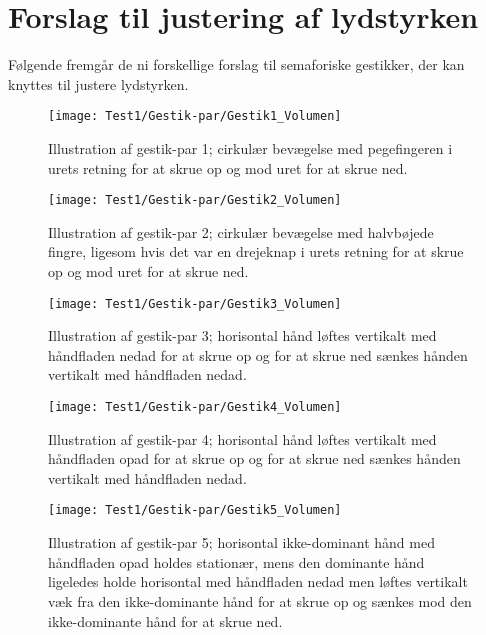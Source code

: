 \section{Forslag til justering af lydstyrken}
\label{app:ForslagVolumen}
%
Følgende fremgår de ni forskellige forslag til semaforiske gestikker, der kan knyttes til justere lydstyrken.
%
\begin{figure}[H]
	\centering
	\texttt{[image: Test1/Gestik-par/Gestik1\_Volumen]}
	\caption{Illustration af gestik-par 1; cirkulær bevægelse med pegefingeren i urets retning for at skrue op og mod uret for at skrue ned.}
	\label{fig:GestikPar1VolumenApp}
\end{figure}
\noindent
%
%
\begin{figure}[H]
	\centering
	\texttt{[image: Test1/Gestik-par/Gestik2\_Volumen]}
	\caption{Illustration af gestik-par 2; cirkulær bevægelse med halvbøjede fingre, ligesom hvis det var en drejeknap i urets retning for at skrue op og mod uret for at skrue ned.}
	\label{fig:GestikPar2VolumenApp}
\end{figure}
\noindent
%
\newpage
%
\begin{figure}[H]
	\centering
	\texttt{[image: Test1/Gestik-par/Gestik3\_Volumen]}
	\caption{Illustration af gestik-par 3; horisontal hånd løftes vertikalt med håndfladen nedad for at skrue op og for at skrue ned sænkes hånden vertikalt med håndfladen nedad.}
	\label{fig:GestikPar3VolumenApp}
\end{figure}
\noindent
%
%
\begin{figure}[H]
	\centering
	\texttt{[image: Test1/Gestik-par/Gestik4\_Volumen]}
	\caption{Illustration af gestik-par 4; horisontal hånd løftes vertikalt med håndfladen opad for at skrue op og for at skrue ned sænkes hånden vertikalt med håndfladen nedad.}
	\label{fig:GestikPar4VolumenApp}
\end{figure}
\noindent
%
%
\begin{figure}[H]
	\centering
	\texttt{[image: Test1/Gestik-par/Gestik5\_Volumen]}
	\caption{Illustration af gestik-par 5; horisontal ikke-dominant hånd med håndfladen opad holdes stationær, mens den dominante hånd ligeledes holde horisontal med håndfladen nedad men løftes vertikalt væk fra den ikke-dominante hånd for at skrue op og sænkes mod den ikke-dominante hånd for at skrue ned.}
	\label{fig:GestikPar5VolumenApp}
\end{figure}

